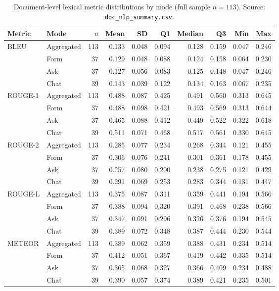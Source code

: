 \begin{table}
\centering
\small
\begin{tabular}{@{}l l r r r r r r r r@{}}
\toprule
Metric & Mode & $n$ & Mean & SD & Q1 & Median & Q3 & Min & Max \\
\midrule
\multirow{4}{*}{BLEU}    & Aggregated  & 113 & 0.133 & 0.048 & 0.094 & 0.128 & 0.159 & 0.047 & 0.246 \\
                         & Form & 37  & 0.129 & 0.048 & 0.088 & 0.124 & 0.158 & 0.064 & 0.230 \\
                         & Ask  & 37  & 0.127 & 0.056 & 0.083 & 0.125 & 0.148 & 0.047 & 0.246 \\
                         & Chat & 39  & 0.143 & 0.039 & 0.122 & 0.134 & 0.163 & 0.067 & 0.235 \\
\midrule
\multirow{4}{*}{ROUGE-1} & Aggregated  & 113 & 0.488 & 0.087 & 0.425 & 0.491 & 0.560 & 0.313 & 0.645 \\
                         & Form & 37  & 0.488 & 0.098 & 0.421 & 0.493 & 0.569 & 0.313 & 0.644 \\
                         & Ask  & 37  & 0.465 & 0.088 & 0.412 & 0.449 & 0.522 & 0.322 & 0.618 \\
                         & Chat & 39  & 0.511 & 0.071 & 0.468 & 0.517 & 0.561 & 0.330 & 0.645 \\
\midrule
\multirow{4}{*}{ROUGE-2} & Aggregated  & 113 & 0.285 & 0.077 & 0.234 & 0.268 & 0.344 & 0.121 & 0.455 \\
                         & Form & 37  & 0.306 & 0.076 & 0.241 & 0.301 & 0.361 & 0.178 & 0.455 \\
                         & Ask  & 37  & 0.257 & 0.080 & 0.200 & 0.238 & 0.275 & 0.121 & 0.429 \\
                         & Chat & 39  & 0.291 & 0.069 & 0.253 & 0.283 & 0.344 & 0.131 & 0.447 \\
\midrule
\multirow{4}{*}{ROUGE-L} & Aggregated  & 113 & 0.375 & 0.087 & 0.311 & 0.359 & 0.441 & 0.194 & 0.566 \\
                         & Form & 37  & 0.388 & 0.094 & 0.320 & 0.391 & 0.468 & 0.238 & 0.566 \\
                         & Ask  & 37  & 0.347 & 0.091 & 0.296 & 0.326 & 0.376 & 0.194 & 0.545 \\
                         & Chat & 39  & 0.389 & 0.072 & 0.348 & 0.387 & 0.444 & 0.230 & 0.544 \\
\midrule
\multirow{4}{*}{METEOR}  & Aggregated  & 113 & 0.389 & 0.062 & 0.359 & 0.388 & 0.431 & 0.234 & 0.514 \\
                         & Form & 37  & 0.412 & 0.051 & 0.367 & 0.419 & 0.442 & 0.335 & 0.514 \\
                         & Ask  & 37  & 0.365 & 0.068 & 0.327 & 0.366 & 0.409 & 0.234 & 0.488 \\
                         & Chat & 39  & 0.390 & 0.057 & 0.374 & 0.389 & 0.421 & 0.235 & 0.501 \\
\bottomrule
\end{tabular}
\caption{Document-level lexical metric distributions by mode (full
sample $n = 113$). Source: \texttt{doc\_nlp\_summary.csv}.}
\label{tab:nlp-doc-distrib-lexical}
\end{table}
